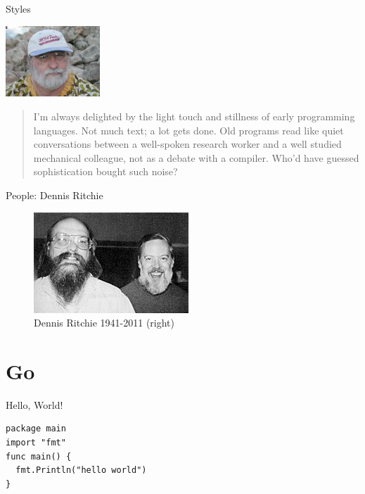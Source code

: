 \begin{frame}{Styles}
  \begin{center}
    \includegraphics[width=1.4in]{img/richard-gabriel.jpg}
  \end{center}
  \begin{quote}
    I'm always delighted by the light touch and stillness of early programming languages.
    Not much text; a lot gets done.
    Old programs read like quiet conversations between a well-spoken research worker and a well studied mechanical colleague, not as a debate with a compiler.
    Who'd have guessed sophistication bought such noise? \\
    \hspace*{}
  \end{quote}

\end{frame}

\begin{frame}{People: Dennis Ritchie}
  \begin{figure}
  \includegraphics{img/ritchie-thompson.jpg}
  \caption*{Dennis Ritchie 1941-2011 (right)}
  \end{figure}
\end{frame}



\section{Go}
\begin{frame}[fragile]{Hello, World!}
  \begin{verbatim}
package main
import "fmt"
func main() {
  fmt.Println("hello world")
}
  \end{verbatim}
\end{frame}
